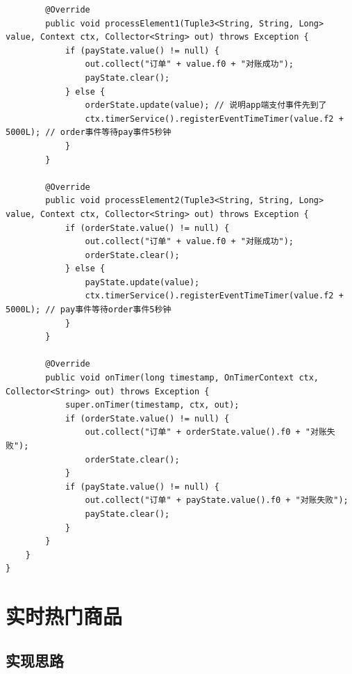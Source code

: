 \documentclass[cn,11pt,chinese]{elegantbook}
\begin{document}
\begin{verbatim}
        @Override
        public void processElement1(Tuple3<String, String, Long> value, Context ctx, Collector<String> out) throws Exception {
            if (payState.value() != null) {
                out.collect("订单" + value.f0 + "对账成功");
                payState.clear();
            } else {
                orderState.update(value); // 说明app端支付事件先到了
                ctx.timerService().registerEventTimeTimer(value.f2 + 5000L); // order事件等待pay事件5秒钟
            }
        }

        @Override
        public void processElement2(Tuple3<String, String, Long> value, Context ctx, Collector<String> out) throws Exception {
            if (orderState.value() != null) {
                out.collect("订单" + value.f0 + "对账成功");
                orderState.clear();
            } else {
                payState.update(value);
                ctx.timerService().registerEventTimeTimer(value.f2 + 5000L); // pay事件等待order事件5秒钟
            }
        }

        @Override
        public void onTimer(long timestamp, OnTimerContext ctx, Collector<String> out) throws Exception {
            super.onTimer(timestamp, ctx, out);
            if (orderState.value() != null) {
                out.collect("订单" + orderState.value().f0 + "对账失败");
                orderState.clear();
            }
            if (payState.value() != null) {
                out.collect("订单" + payState.value().f0 + "对账失败");
                payState.clear();
            }
        }
    }
}
\end{verbatim}

\section{实时热门商品}

\subsection{实现思路}
\end{document}
